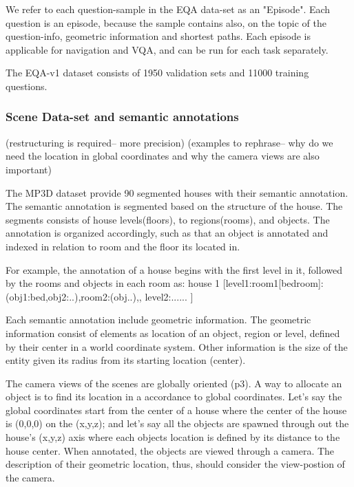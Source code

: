 We refer to each question-sample in the EQA data-set as an "Episode". Each question is an episode, because the sample contains also, on the topic of the question-info, geometric information and shortest paths. Each episode is applicable for navigation and VQA, and can be run for each task separately. 

The EQA-v1 dataset consists of 1950 validation sets and 11000 training questions.

\subsubsection{Scene Data-set and semantic annotations}



(restructuring is required-- more precision) (examples to rephrase-- why do we need the location in global coordinates and why the camera views are also important)

The MP3D dataset provide 90 segmented houses with their semantic annotation. The semantic annotation is segmented based on the structure of the house. The segments consists of house levels(floors), to regions(rooms), and objects. The annotation is organized accordingly, such as that an object is annotated and indexed in relation to room and the floor its located in. 

For example, the annotation of a house begins with the first level in it, followed by the rooms and objects in each room as: house 1 [{level1:room1[bedroom]:(obj1:bed,obj2:..),room2:(obj..)},, {level2:......} ]  

Each semantic annotation include geometric information. The geometric information consist of elements as location of an object, region or level, defined by their center in a world coordinate system. Other information is the size of the entity given its radius from its starting location (center).   

The camera views of the scenes are globally oriented \cite{Matterport3D}(p3). A way to allocate an object is to find its location in a accordance to global coordinates. Let's say the global coordinates start from the center of a house where the center of the house is (0,0,0) on the (x,y,z); and let's say all the objects are spawned through out the house's (x,y,z) axis where each objects location is defined by its distance to the house center. When annotated, the objects are viewed through a camera. The description of their geometric location, thus, should consider the view-postion of the camera. 

